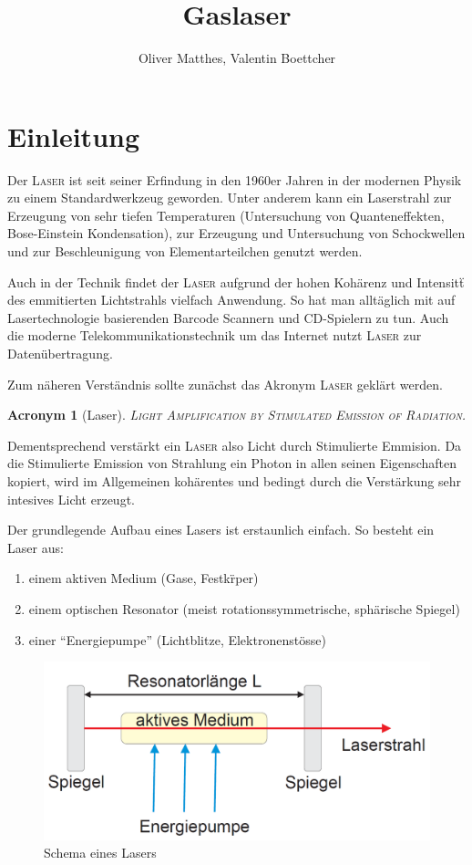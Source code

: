\documentclass[slug=GL, room=HZDR\ Dresden/Rossendorf\,\ Geb.\ 620/123, supervisor=Martin\ Rehwald;\, Tim\ Ziegler]{../../Lab_Report_LaTeX/lab_report}
\title{Gaslaser}
\author{Oliver Matthes, Valentin Boettcher}
\newcommand{\laser}{\textsc{Laser}}
\newtheorem{acro}{Acronym}[section]
\begin{document}
\maketitle

\section{Einleitung}%
\label{sec:intro}
Der \laser{} ist seit seiner Erfindung in den 1960er Jahren in der
modernen Physik zu einem Standardwerkzeug geworden. Unter anderem
kann ein Laserstrahl zur Erzeugung von sehr tiefen Temperaturen
(Untersuchung von Quanteneffekten, Bose-Einstein Kondensation), zur
Erzeugung und Untersuchung von Schockwellen und zur Beschleunigung von
Elementarteilchen genutzt werden.

 Auch in der Technik findet der \laser{} aufgrund
der hohen Koh\"arenz und Intensit\"t des emmitierten Lichtstrahls
vielfach Anwendung. So hat man allt\"aglich mit auf Lasertechnologie
basierenden Barcode Scannern und CD-Spielern zu tun. Auch die moderne
Telekommunikationstechnik um das Internet nutzt \laser{} zur
Daten\"ubertragung.

Zum n\"aheren Verst\"andnis sollte zun\"achst das Akronym \laser{}
gekl\"art werden.

\begin{acro}[Laser]
\textsc{Light Amplification by Stimulated Emission of Radiation.}
\end{acro}

Dementsprechend verst\"arkt ein \laser{} also Licht durch Stimulierte
Emmision. Da die Stimulierte Emission von Strahlung ein Photon in
allen seinen Eigenschaften kopiert, wird im Allgemeinen koh\"arentes
und bedingt durch die Verst\"arkung sehr intesives Licht erzeugt.

Der grundlegende Aufbau eines Lasers ist erstaunlich einfach. So
besteht ein Laser aus:

\begin{enumerate}
\item einem aktiven Medium (Gase, Festk\"rper)
\item einem optischen Resonator (meist rotationssymmetrische, sph\"arische Spiegel)
\item einer ``Energiepumpe'' (Lichtblitze, Elektronenst\"osse)
\end{enumerate}

\begin{figure}[H]\centering
  \includegraphics[width=.5\columnwidth]{schema.png}
  \caption[Aufbau]{Schema eines Lasers}
  \label{fig:aufb}
\end{figure}
\end{document}
